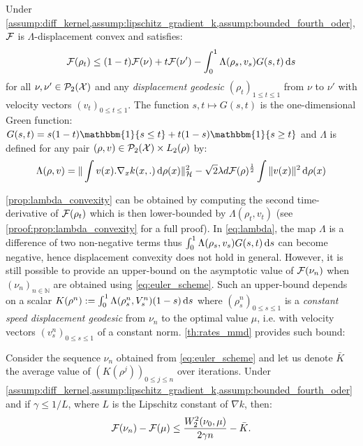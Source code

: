 \begin{proposition}
	\label{prop:lambda_convexity} Under \cref{assump:diff_kernel,assump:lipschitz_gradient_k,assump:bounded_fourth_oder}, ${{\mathcal F}}$ is $\Lambda$-displacement convex and satisfies:
		\begin{equation}
	{{\mathcal F}}(\rho_{t})\leq(1-t){{\mathcal F}}(\nu)+t{{\mathcal F}}(\nu')-\int_0^1 \Lambda(\rho_s, v_s ) G(s,t)\mathop{}\!\mathrm{d} s
	\end{equation}
for all $\nu, \nu'\in \mathcal{P}_2({{\mathcal X}})$ and any \textit{displacement geodesic} $(\rho_t)_{1\leq t\leq 1}$ from $\nu$ to $\nu'$ with velocity vectors $(v_t)_{0\leq t\leq 1}$.
The function $s,t\mapsto G(s,t)$ is the one-dimensional Green function: $G(s, t) =  s(1-t) \mathbbm{1}\{s\leq t\}+ t(1-s) \mathbbm{1}\{s\geq t\}$ and $\Lambda$ is defined for any pair $(\rho,v)\in \mathcal{P}_2({{\mathcal X}})\times L_2(\rho)$  by:
	\begin{align}\label{eq:lambda}
		\Lambda(\rho,v) = \Vert \int v(x).\nabla_x k(x,.) \mathop{}\!\mathrm{d} \rho(x) \Vert^2_{\mathcal{H}} - \sqrt{2}\lambda d {{\mathcal F}}(\rho)^{\frac{1}{2}}  \int \Vert  v(x) \Vert^2 \mathop{}\!\mathrm{d} \rho(x) 
	\end{align}
	\end{proposition}
\cref{prop:lambda_convexity} can be obtained by computing the second time-derivative of ${{\mathcal F}}(\rho_t)$ which is then lower-bounded by $\Lambda(\rho_t,v_t)$ (see \cref{proof:prop:lambda_convexity} for a full proof).
In \cref{eq:lambda}, the map $\Lambda$ is a difference of two non-negative terms thus $\int_0^1 \Lambda(\rho_s, v_s ) G(s,t)\mathop{}\!\mathrm{d} s$ can become negative, hence displacement convexity does not hold in general. However, it is still possible to provide an upper-bound on the asymptotic value of ${{\mathcal F}}(\nu_n)$ when $(\nu_n)_{n \in \mathbb{N}}$ are obtained using \cref{eq:euler_scheme}. Such an upper-bound depends on a scalar $ K(\rho^n) :=  \int_0^1\Lambda(\rho_s^n,V_s^n)(1-s)\mathop{}\!\mathrm{d} s$ where $(\rho_s^n)_{0\leq s\leq 1}$ is a \textit{constant speed displacement geodesic} from $\nu_n$ to the optimal value $\mu$, i.e. with velocity vectors $(v_s^n)_{0\leq s\leq 1}$ of a constant norm. \cref{th:rates_mmd} provides such bound:
\begin{theorem}\label{th:rates_mmd}
	Consider the sequence $\nu_n$ obtained from \cref{eq:euler_scheme} and let us denote $\bar{K}$ the average value of $(K(\rho^j))_{0\leq j \leq n}$ over iterations.  Under \cref{assump:diff_kernel,assump:lipschitz_gradient_k,assump:bounded_fourth_oder} and if $\gamma \leq 1/L$, where $L$ is the Lipschitz constant of $\nabla k$, then:
\begin{align}
{{\mathcal F}}(\nu_n) - {{\mathcal F}}(\mu)\leq  \frac{W_2^2(\nu_0,\mu)}{2 \gamma n} -\bar{K}.
\end{align}
\end{theorem}
